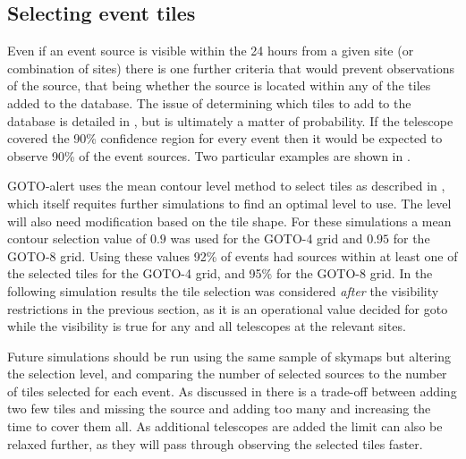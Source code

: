 \begin{colsection}
\begin{colsection}
\clearpage

\end{colsection}


\subsection{Selecting event tiles}
\label{sec:gw_selecting}
\begin{colsection}

Even if an event source is visible within the 24 hours from a given site (or combination of sites) there is one further criteria that would prevent observations of the source, that being whether the source is located within any of the tiles added to the database. The issue of determining which tiles to add to the database is detailed in , but is ultimately a matter of probability. If the telescope covered the 90\% confidence region for every event then it would be expected to observe 90\% of the event sources. Two particular examples are shown in .

GOTO-alert uses the mean contour level method to select tiles as described in , which itself requites further simulations to find an optimal level to use. The level will also need modification based on the tile shape. For these simulations a mean contour selection value of $0.9$ was used for the GOTO-4 grid and $0.95$ for the GOTO-8 grid. Using these values 92\% of events had sources within at least one of the selected tiles for the GOTO-4 grid, and 95\% for the GOTO-8 grid. In the following simulation results the tile selection was considered \textit{after} the visibility restrictions in the previous section, as it is an operational value decided for \gls{goto} while the visibility is true for any and all telescopes at the relevant sites.

Future simulations should be run using the same sample of skymaps but altering the selection level, and comparing the number of selected sources to the number of tiles selected for each event. As discussed in  there is a trade-off between adding two few tiles and missing the source and adding too many and increasing the time to cover them all. As additional telescopes are added the limit can also be relaxed further, as they will pass through observing the selected tiles faster.


\end{colsection}
\end{colsection}
